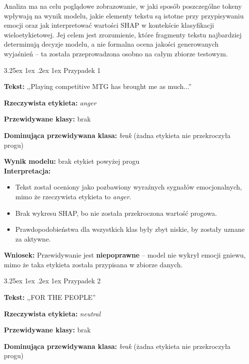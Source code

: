 \documentclass[wmii, inf, mgr]{uwmthesis}
\makeatletter
\renewcommand\paragraph{\@startsection{paragraph}{4}{\z@}%
  {3.25ex \@plus1ex \@minus.2ex}%
  {1ex}%
  {\normalfont\normalsize\bfseries}}
\makeatother
\begin{document}
Analiza ma na celu poglądowe zobrazowanie, w jaki sposób poszczególne tokeny wpływają na wynik modelu, jakie elementy tekstu są istotne przy przypisywaniu emocji oraz jak interpretować wartości SHAP w kontekście klasyfikacji wieloetykietowej. Jej celem jest zrozumienie, które fragmenty tekstu najbardziej determinują decyzje modelu, a nie formalna ocena jakości generowanych wyjaśnień -- ta została przeprowadzona osobno na całym zbiorze testowym.



\paragraph{Przypadek 1}

\textbf{Tekst:} ,,Playing competitive MTG has brought me as much...''

\textbf{Rzeczywista etykieta:} \textit{anger}

\textbf{Przewidywane klasy:} brak

\textbf{Dominująca przewidywana klasa:} \textit{brak} (żadna etykieta nie przekroczyła progu)

\textbf{Wynik modelu:} brak etykiet powyżej progu\\[2mm]

\textbf{Interpretacja:}
\begin{itemize}
	\item Tekst został oceniony jako pozbawiony wyraźnych sygnałów emocjonalnych, mimo że rzeczywista etykieta to \textit{anger}.
	\item Brak wykresu SHAP, bo nie została przekroczona wartość progowa.
	\item Prawdopodobieństwa dla wszystkich klas były zbyt niskie, by zostały uznane za aktywne.
\end{itemize}

\textbf{Wniosek:} Przewidywanie jest \textbf{niepoprawne} -- model nie wykrył emocji gniewu, mimo że taka etykieta została przypisana w zbiorze danych.



\paragraph{Przypadek 2}

\textbf{Tekst:} ,,FOR THE PEOPLE''

\textbf{Rzeczywista etykieta:} \textit{neutral}

\textbf{Przewidywane klasy:} brak

\textbf{Dominująca przewidywana klasa:} \textit{brak} (żadna etykieta nie przekroczyła progu)
\end{document}

